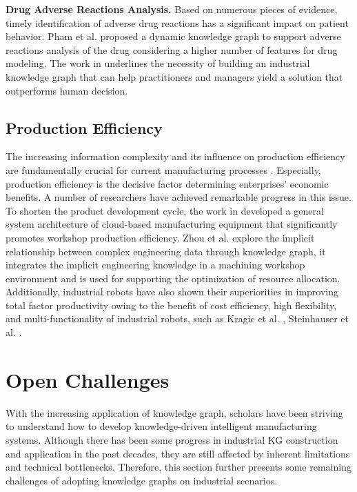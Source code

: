 \documentclass[11pt]{article}
\begin{document}
\par{\textbf{Drug Adverse Reactions Analysis.}
Based on numerous pieces of evidence, timely identification of adverse drug reactions has a significant impact on patient behavior.
Pham et al. \cite{bib54} proposed a dynamic knowledge graph to support adverse reactions analysis of the drug considering a higher number of features for drug modeling.
The work in \cite{bib55} underlines the necessity of building an industrial knowledge graph that can help practitioners and managers yield a solution that outperforms human decision.}


\subsection{Production Efficiency}
\par{The increasing information complexity and its influence on production efficiency are fundamentally crucial for current manufacturing processes \cite{bib56}.
Especially, production efficiency is the decisive factor determining enterprises' economic benefits.
A number of researchers have achieved remarkable progress in this issue.
To shorten the product development cycle, the work in \cite{bib57} developed a general system architecture of cloud-based manufacturing equipment that significantly promotes workshop production efficiency.
Zhou et al. \cite{bib58} explore the implicit relationship between complex engineering data through knowledge graph, it integrates the implicit engineering knowledge in a machining workshop environment and is used for supporting the optimization of resource allocation.
Additionally, industrial robots have also shown their superiorities in improving total factor productivity owing to the benefit of cost efficiency, high flexibility, and multi-functionality of industrial robots, such as Kragic et al. \cite{bib59}, Steinhauser et al. \cite{bib60}. }


\section{Open Challenges}\label{sec5}
\par{With the increasing application of knowledge graph, scholars have been striving to understand how to develop knowledge-driven intelligent manufacturing systems.
Although there has been some progress in industrial KG construction and application in the past decades, they are still affected by inherent limitations and technical bottlenecks.
Therefore, this section further presents some remaining challenges of adopting knowledge graphs on industrial scenarios.}
\end{document}
